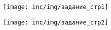 \begin{figure}[H]
	\centering
	\texttt{[image: inc/img/задание\_стр1]}
\end{figure}

\begin{figure}[H]
	\centering
	\texttt{[image: inc/img/задание\_стр2]}
\end{figure}
